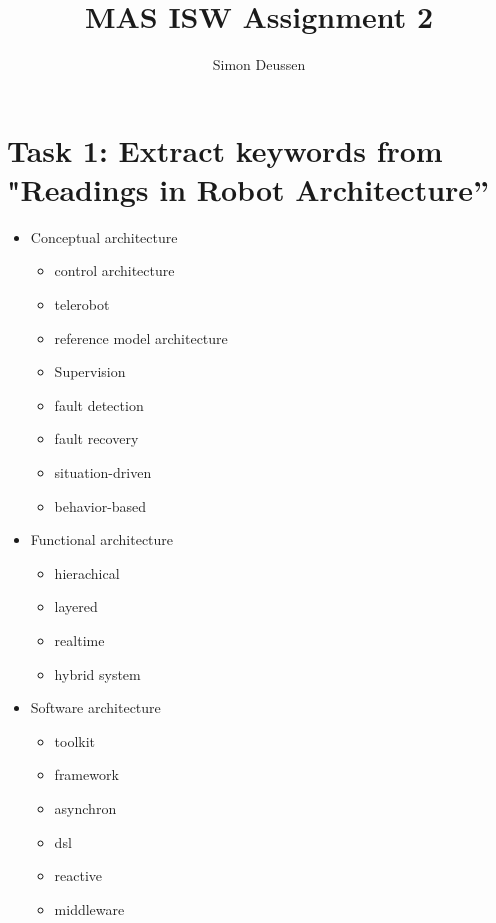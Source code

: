 \documentclass{article}
\title{MAS ISW Assignment 2}
\author{Simon Deussen}
\begin{document}
  \maketitle

\section*{Task 1: Extract keywords from "Readings in Robot Architecture”}
\begin{itemize}
    \item Conceptual architecture
    \begin{itemize}
        \item control architecture 
        \item telerobot
        \item reference model architecture
        \item Supervision
        \item fault detection
        \item fault recovery
        \item situation-driven
        \item behavior-based
    \end{itemize} 
    \item Functional architecture
    \begin{itemize}
        \item hierachical
        \item layered
        \item realtime
        \item hybrid system
    \end{itemize} 
    \item Software architecture
    \begin{itemize}
        \item toolkit
        \item framework
        \item asynchron
        \item dsl
        \item reactive
        \item middleware


\end{itemize}
\end{itemize}
\end{document}
